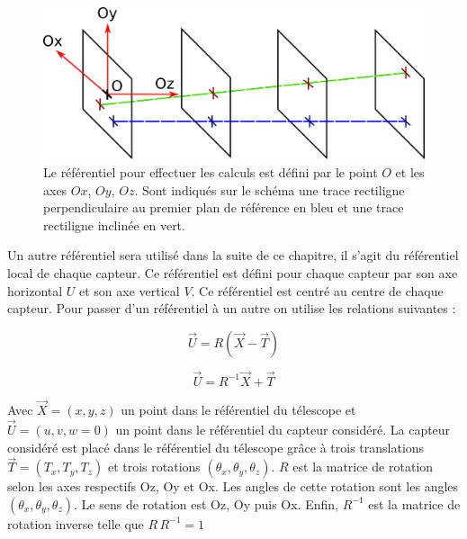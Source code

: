   \begin{figure}[!htb]
    \begin{center}
      \includegraphics[scale=1.50]{./figures/plan_referentiel.png}
      \caption{Le r\'ef\'erentiel pour effectuer les calculs est d\'efini par le point $O$ et les axes $Ox$, $Oy$, $Oz$. Sont indiqu\'es sur le sch\'ema une trace rectiligne perpendiculaire au premier plan de r\'ef\'erence en bleu et une trace rectiligne inclin\'ee en vert.}
      \label{fig:ref}
    \end{center}
  \end{figure}
   
   \medskip
   
   Un autre r\'ef\'erentiel sera utilis\'e dans la suite de ce chapitre, il s'agit du r\'ef\'erentiel local de chaque capteur. Ce r\'ef\'erentiel est d\'efini pour chaque capteur par son axe horizontal $U$ et son axe vertical $V$. Ce r\'ef\'erentiel est centr\'e au centre de chaque capteur. Pour passer d'un r\'ef\'erentiel \`a un autre on utilise les relations suivantes :
   
   \begin{equation}
    \overrightarrow{U} = R \left( \overrightarrow{X} - \overrightarrow{T} \right)
   \end{equation}
   
   \begin{equation}
    \overrightarrow{U} = R^{-1} \overrightarrow{X} + \overrightarrow{T} 
   \end{equation}

   Avec $\overrightarrow{X} = (x, y, z)$ un point dans le r\'ef\'erentiel du t\'elescope et $\overrightarrow{U} = (u, v, w=0)$ un point dans le r\'ef\'erentiel du capteur consid\'er\'e. La capteur consid\'er\'e est plac\'e dans le r\'ef\'erentiel du t\'elescope gr\^ace \`a trois translations $\overrightarrow{T} = (T_x, T_y, T_z)$ et trois rotations $(\theta_x, \theta_y, \theta_z)$. $R$ est la matrice de rotation selon les axes respectifs Oz, Oy et Ox. Les angles de cette rotation sont les angles $(\theta_x, \theta_y, \theta_z)$. Le sens de rotation est Oz, Oy puis Ox. Enfin, $R^{-1}$ est la matrice de rotation inverse telle que $R \, R^{-1} = 1$
   
